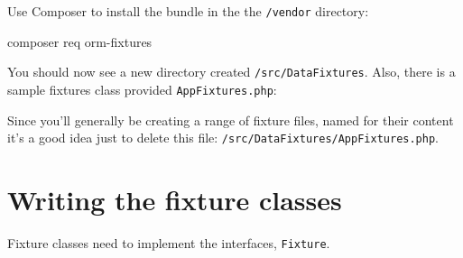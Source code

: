 \documentclass[a4paperpaper,openright]{book}
\newenvironment{Shaded}{}{}
\newcommand{\CommentTok}[1]{\textcolor[rgb]{0.38,0.63,0.69}{\textit{#1}}}
\newcommand{\ExtensionTok}[1]{#1}
\newcommand{\FunctionTok}[1]{\textcolor[rgb]{0.02,0.16,0.49}{#1}}
\newcommand{\KeywordTok}[1]{\textcolor[rgb]{0.00,0.44,0.13}{\textbf{#1}}}
\newcommand{\NormalTok}[1]{#1}
\newcommand{\OtherTok}[1]{\textcolor[rgb]{0.00,0.44,0.13}{#1}}
\begin{document}
Use Composer to install the bundle in the the \texttt{/vendor}
directory:

\begin{Shaded}
\begin{Highlighting}[]
    \ExtensionTok{composer}\NormalTok{ req orm-fixtures}
\end{Highlighting}
\end{Shaded}

You should now see a new directory created \texttt{/src/DataFixtures}.
Also, there is a sample fixtures class provided
\texttt{AppFixtures.php}:

\begin{Shaded}
\end{Shaded}

Since you'll generally be creating a range of fixture files, named for
their content it's a good idea just to delete this file:
\texttt{/src/DataFixtures/AppFixtures.php}.

\hypertarget{writing-the-fixture-classes}{%
\section{Writing the fixture
classes}\label{writing-the-fixture-classes}}

Fixture classes need to implement the interfaces, \texttt{Fixture}.
\end{document}
